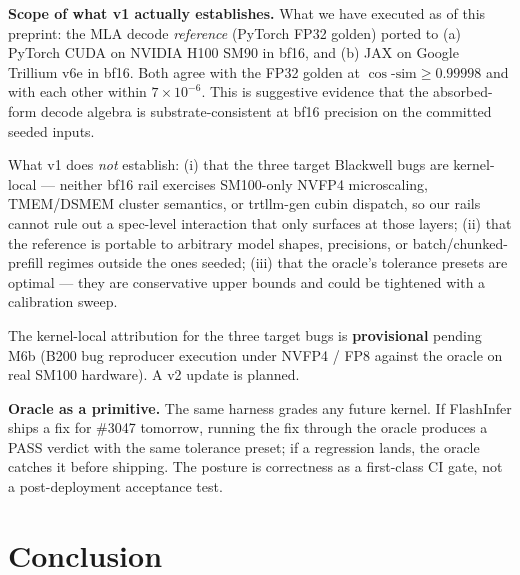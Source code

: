\documentclass[11pt]{article}
\begin{document}
\textbf{Scope of what v1 actually establishes.} What we have executed
as of this preprint: the MLA decode \emph{reference} (PyTorch FP32 golden)
ported to (a) PyTorch CUDA on NVIDIA H100 SM90 in bf16, and (b) JAX on
Google Trillium v6e in bf16. Both agree with the FP32 golden at
$\cos\text{-}\mathrm{sim} \geq 0.99998$ and with each other within
$7\times 10^{-6}$. This is suggestive evidence that the absorbed-form
decode algebra is substrate-consistent at bf16 precision on the
committed seeded inputs.

What v1 does \emph{not} establish: (i) that the three target Blackwell
bugs are kernel-local --- neither bf16 rail exercises SM100-only NVFP4
microscaling, TMEM/DSMEM cluster semantics, or trtllm-gen cubin
dispatch, so our rails cannot rule out a spec-level interaction that
only surfaces at those layers; (ii) that the reference is portable to
arbitrary model shapes, precisions, or batch/chunked-prefill regimes
outside the ones seeded; (iii) that the oracle's tolerance presets are
optimal --- they are conservative upper bounds and could be tightened
with a calibration sweep.

The kernel-local attribution for the three target bugs is
\textbf{provisional} pending M6b (B200 bug reproducer execution under
NVFP4 / FP8 against the oracle on real SM100 hardware). A v2 update
is planned.

\textbf{Oracle as a primitive.} The same harness grades any future
kernel. If FlashInfer ships a fix for \#3047 tomorrow, running the fix
through the oracle produces a PASS verdict with the same tolerance
preset; if a regression lands, the oracle catches it before shipping.
The posture is correctness as a first-class CI gate, not a
post-deployment acceptance test.

\section{Conclusion}
\label{sec:conclusion}
\end{document}
